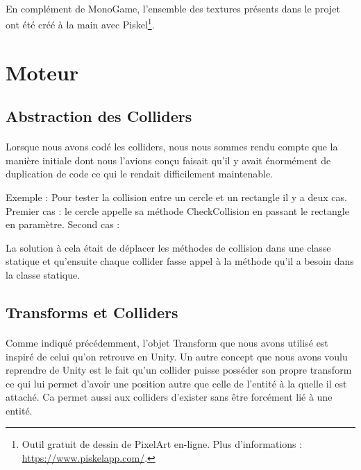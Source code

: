 \documentclass{EPUProjetDi}
\begin{document}
\paragraph{}
En complément de MonoGame, l'ensemble des textures présents dans le projet ont été créé à la main avec Piskel\footnote{Outil gratuit de dessin de PixelArt en-ligne. 
Plus d'informations : \url{https://www.piskelapp.com/}.}. 

\section{Moteur}

\subsection{Abstraction des Colliders}

\paragraph{}
Lorsque nous avons codé les colliders, nous nous sommes rendu compte que la manière initiale dont nous l'avions conçu
faisait qu'il y avait énormément de duplication de code ce qui le rendait difficilement maintenable.

Exemple : Pour tester la collision entre un cercle et un rectangle il y a deux cas. Premier cas : le cercle appelle sa méthode CheckCollision en passant le rectangle en paramètre.
Second cas : 

La solution à cela était de déplacer les méthodes de collision dans une classe statique et qu'ensuite chaque collider fasse appel à la méthode qu'il a besoin dans la classe statique.

\subsection{Transforms et Colliders}
\paragraph{}
Comme indiqué précédemment, l'objet Transform que nous avons utilisé est inspiré de celui qu'on retrouve en Unity. Un autre concept que nous avons voulu reprendre de Unity est le fait qu'un
collider puisse posséder son propre transform ce qui lui permet d'avoir une position autre que celle de l'entité à la quelle il est attaché. Ca permet aussi aux colliders d'exister sans être forcément
lié à une entité.
\end{document}
